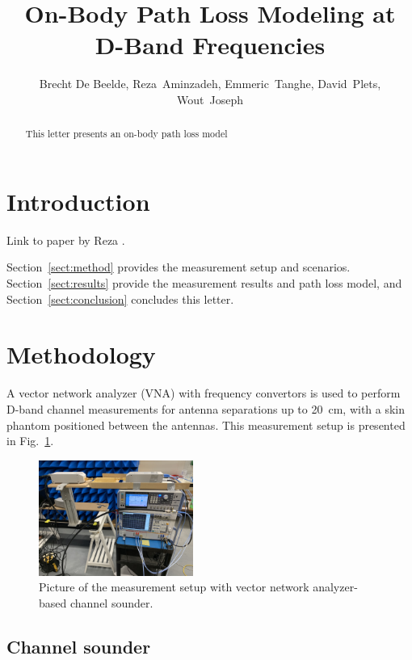 \documentclass[preprint]{rsl}
\title{On-Body Path Loss Modeling at D-Band Frequencies}
\author{Brecht De Beelde,	%
Reza~Aminzadeh,	%
Emmeric~Tanghe,	%
David~Plets,		%
Wout~Joseph		%
}
\begin{document}
\maketitle

%
%

\begin{abstract}

This letter presents an on-body path loss model

\end{abstract}

\section{Introduction\label{sect:intro}}

Link to paper by Reza \cite{Aminzadeh2021_tap}. 

Section~\ref{sect:method} provides the measurement setup and scenarios. 
Section~\ref{sect:results} provide the measurement results and path loss model, and Section~\ref{sect:conclusion} concludes this letter.

\section{Methodology \label{sect:method}}

A vector network analyzer (VNA) with frequency convertors is used to perform D-band channel measurements for antenna separations up to 20~cm, with a skin phantom positioned between the antennas. 
This measurement setup is presented in Fig.~\ref{fig:sounder_setup}.
\begin{figure}[tb]
\begin{center}
	\includegraphics[width=0.45\textwidth]{figures/measurement_setup}
\caption{Picture of the measurement setup with vector network analyzer-based channel sounder.}
\label{fig:sounder_setup}
\end{center}
\end{figure}

\subsection{Channel sounder}
\end{document}

